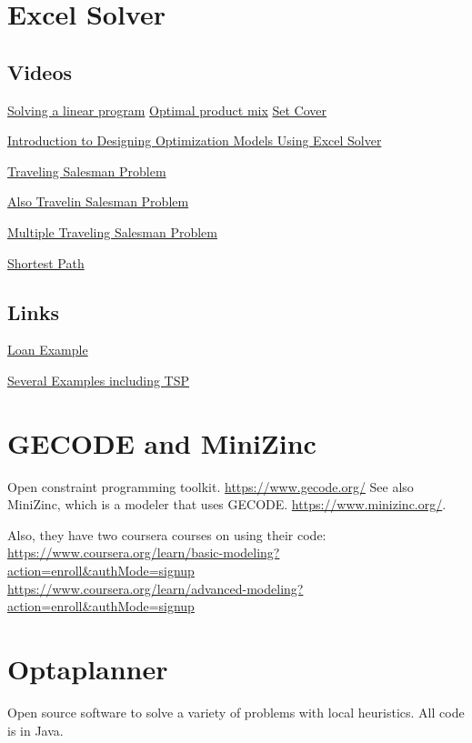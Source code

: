 \documentclass[letter,12pt]{book}
\renewcommand{\0}{\mathbf{0}}
\begin{document}
\section{Excel Solver}
\subsection{Videos}
\href{https://www.youtube.com/watch?v=V5DmekIFenA}{Solving a linear program}
\href{https://www.youtube.com/watch?v=6xa1x_Iqjzg}{Optimal product mix}
\href{https://www.youtube.com/watch?v=vpodCzRtUMU}{Set Cover}

\href{https://www.youtube.com/watch?v=tKV24jzZ10s}{Introduction to Designing Optimization Models Using Excel Solver}

\href{https://www.youtube.com/watch?v=-E3rSoClgMI}{Traveling Salesman Problem}

\href{https://www.youtube.com/watch?v=UQYJvSjXE6I}{Also Travelin Salesman Problem}

\href{https://www.youtube.com/watch?v=owHq3Mbniqo}{Multiple Traveling Salesman Problem}

\href{https://www.youtube.com/watch?v=JkZkGxVZ8ao}{Shortest Path}

\subsection{Links}
\href{https://github.com/lobodemonte/excel-solver-loan-example}{Loan Example}

\href{https://github.com/Bhargavanarasimhan/Excel-Solver-Files}{Several Examples including TSP}


\section{GECODE and MiniZinc}
Open constraint programming toolkit.
\url{https://www.gecode.org/}
See also MiniZinc, which is a modeler that uses GECODE.
\url{https://www.minizinc.org/}.

Also, they have two coursera courses on using their code:
\url{https://www.coursera.org/learn/basic-modeling?action=enroll&authMode=signup}\\
\url{https://www.coursera.org/learn/advanced-modeling?action=enroll&authMode=signup}


\section{Optaplanner}
Open source software to solve a variety of problems with local heuristics.  All code is in Java.  
\end{document}
